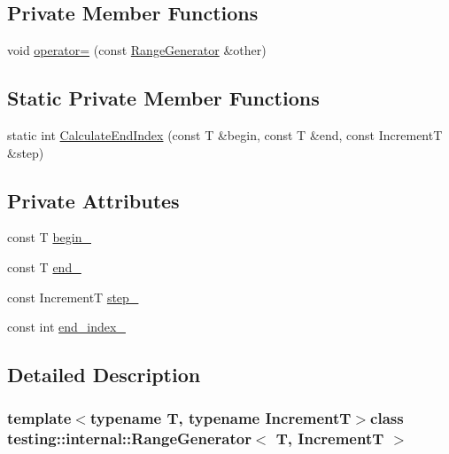 \subsection*{\-Private \-Member \-Functions}
\begin{DoxyCompactItemize}
\item 
void \hyperlink{classtesting_1_1internal_1_1RangeGenerator_a45e0a62d3b91b1ecfe510125a5f638a5}{operator=} (const \hyperlink{classtesting_1_1internal_1_1RangeGenerator}{\-Range\-Generator} \&other)
\end{DoxyCompactItemize}
\subsection*{\-Static \-Private \-Member \-Functions}
\begin{DoxyCompactItemize}
\item 
static int \hyperlink{classtesting_1_1internal_1_1RangeGenerator_aa4caca7f43c0ac76bdd25095c477ae3b}{\-Calculate\-End\-Index} (const \-T \&begin, const \-T \&end, const \-Increment\-T \&step)
\end{DoxyCompactItemize}
\subsection*{\-Private \-Attributes}
\begin{DoxyCompactItemize}
\item 
const \-T \hyperlink{classtesting_1_1internal_1_1RangeGenerator_a4ba128ffa92b7d1db9dc8239649919bb}{begin\-\_\-}
\item 
const \-T \hyperlink{classtesting_1_1internal_1_1RangeGenerator_aa62bed3cca62b4bff84269ee7ebc875e}{end\-\_\-}
\item 
const \-Increment\-T \hyperlink{classtesting_1_1internal_1_1RangeGenerator_ab1ed3e7cdff8cb7dd4d077c865a66c1a}{step\-\_\-}
\item 
const int \hyperlink{classtesting_1_1internal_1_1RangeGenerator_a7fc35c2d41cf88d19ad5211754ef99f3}{end\-\_\-index\-\_\-}
\end{DoxyCompactItemize}


\subsection{\-Detailed \-Description}
\subsubsection*{template$<$typename T, typename Increment\-T$>$class testing\-::internal\-::\-Range\-Generator$<$ T, Increment\-T $>$}



